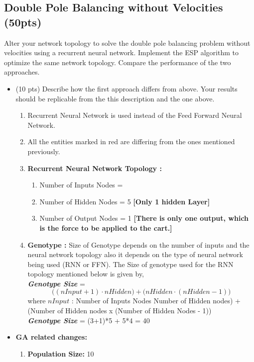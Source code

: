 \documentclass{article}
\begin{document}
\newpage
\subsection{Double Pole Balancing without Velocities (50pts)}
Alter your network topology to solve the double pole balancing problem without velocities using a recurrent neural network. Implement the ESP algorithm to optimize the same network topology. Compare the performance of the two approaches.
\begin{itemize}
	\item (10 pts) Describe how the first approach differs from above. Your results should be replicable from the this description and the one above.
	\color{blue}
\begin{enumerate}
	\item Recurrent Neural Network is used instead of the Feed Forward Neural Network.
	\item All the entities marked in red are differing from the ones mentioned previously.
	\item \textbf{Recurrent Neural Network Topology :}
	\begin{enumerate}
	\item Number of Inputs Nodes = \color{red}{3 = [Cart Position, Pole1 Position, Pole2 Position]} \color{blue}
	\item Number of Hidden Nodes = 5 \textbf{[Only 1 hidden Layer]}
	\item Number of Output Nodes = 1 \textbf{[There is only one output, which is the force to be applied to the cart.]}
	\end{enumerate}
	\item \textbf{Genotype :} Size of Genotype depends on the number of inputs and the neural network topology also it depends on the type of neural network being used (RNN or FFN). The Size of genotype used for the RNN topology mentioned below is given by, \\
	\textit{\textbf{Genotype Size}} = \color{red}$$\big( (nInput+1) \cdot nHidden \big) + \big( nHidden \cdot (nHidden-1) \big)$$ where $nInput$ : Number of Inputs Nodes Number of Hidden nodes) + (Number of Hidden nodes x (Number of Hidden Nodes - 1))\color{blue}\\
	\textbf{\textit{Genotype Size}} = \color{red}(3+1)*5 + 5*4 = 40\color{blue}
\end{enumerate}
\item \textbf{GA related changes:}
\begin{enumerate}
\item \textbf{Population Size:} 10

\end{enumerate}
\end{itemize}
\end{document}
